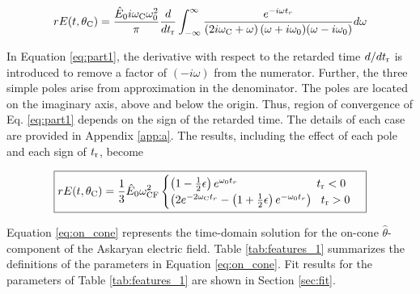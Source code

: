 \documentclass[amsmath,amssymb,aps,prd,10pt,twocolumn]{revtex4}
\begin{document}
\begin{widetext}
\begin{equation}
r E(t,\theta_{\rm C}) = \frac{\hat{E}_0 i \omega_{\rm C} \omega_{\rm 0}^2}{\pi} \frac{d}{dt_{\rm r}}\int_{-\infty}^{\infty} \frac{ e^{-i\omega t_r}}{ \left(2 i \omega_{\rm C} + \omega \right) (\omega+i\omega_{\rm 0}) (\omega - i\omega_{\rm 0}) } d\omega \label{eq:part1}
\end{equation}
\end{widetext}

In Equation \ref{eq:part1}, the derivative with respect to the retarded time $d/dt_{\rm r}$ is introduced to remove a factor of $(-i\omega)$ from the numerator.  Further, the three simple poles arise from approximation in the denominator.  The poles are located on the imaginary axis, above and below the origin.  Thus, region of convergence of Eq. \ref{eq:part1} depends on the sign of the retarded time.  The details of each case are provided in Appendix \ref{app:a}.  The results, including the effect of each pole and each sign of $t_{\rm r}$, become

\begin{widetext}
\begin{equation}
\boxed{
r E(t,\theta_{\rm C}) = \frac{1}{3} \hat{E}_0 \omega_{\rm CF}^2
\begin{cases}
\left(1 - \frac{1}{2}\epsilon \right)e^{\omega_{\rm 0} t_r} ~~~~~~~~~~~~~~~~~~~~~ t_{\rm r} < 0 \\
\left( 2 e^{-2\omega_{\rm C} t_r} - \left(1+\frac{1}{2}\epsilon \right) e^{-\omega_{\rm 0}t_r} \right) ~~ t_{\rm r} > 0
\end{cases}
} \label{eq:on_cone}
\end{equation}
\end{widetext}

Equation \ref{eq:on_cone} represents the time-domain solution for the on-cone $\hat{\theta}$-component of the Askaryan electric field.  Table \ref{tab:features_1} summarizes the definitions of the parameters in Equation \ref{eq:on_cone}.  Fit results for the parameters of Table \ref{tab:features_1} are shown in Section \ref{sec:fit}.
\end{document}
